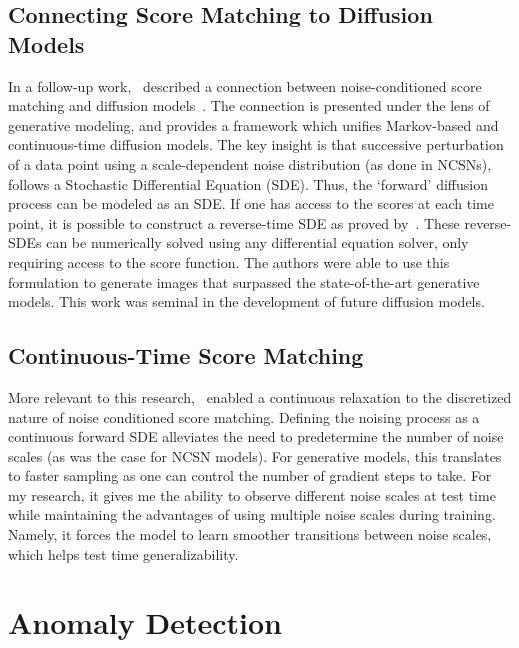 
\subsection*{Connecting Score Matching to Diffusion Models}

In a follow-up work,~\cite{song2020score} described a connection between noise-conditioned score matching and diffusion models~\cite{sohl2015deep}. The connection is presented under the lens of generative modeling, and provides a framework which unifies Markov-based and continuous-time diffusion models. The key insight is that successive perturbation of a data point using a scale-dependent noise distribution (as done in NCSNs), follows a Stochastic Differential Equation (SDE). Thus, the `forward' diffusion process can be modeled as an SDE. If one has access to the scores at each time point, it is possible to construct a reverse-time SDE as proved by~\cite{anderson1982reverse}. These reverse-SDEs can be numerically solved using any differential equation solver, only requiring access to the score function. The authors were able to use this formulation to generate images that surpassed the state-of-the-art generative models. This work was seminal in the development of future diffusion models.

\subsection*{Continuous-Time Score Matching}
More relevant to this research,~\cite{song2020score} enabled a continuous relaxation to the discretized nature of noise conditioned score matching. Defining the noising process as a continuous forward SDE alleviates the need to predetermine the number of noise scales (as was the case for NCSN models). For generative models, this translates to faster sampling as one can control the number of gradient steps to take. For my research, it gives me the ability to observe different noise scales at test time while maintaining the advantages of using multiple noise scales during training. Namely, it forces the model to learn smoother transitions between noise scales, which helps test time generalizability.

\section{Anomaly Detection}

